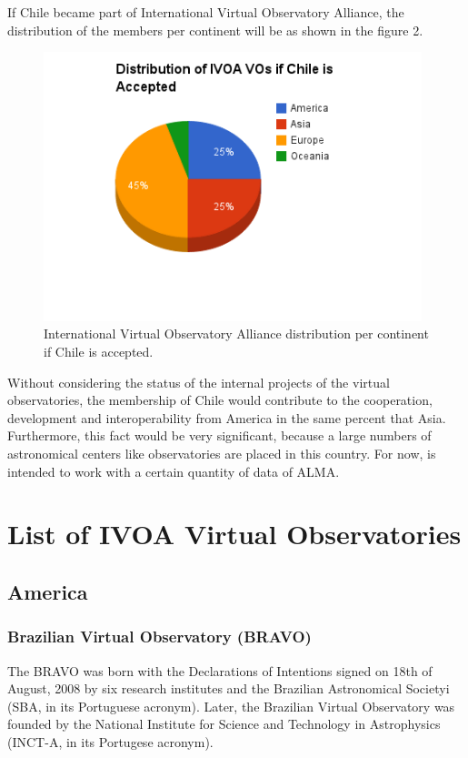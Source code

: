 \documentclass[11pt]{article}
\begin{document}
            If Chile became part of International Virtual Observatory Alliance,
the distribution of the members per continent will be as shown in the figure
2.\\

            \begin{figure}[h]
                \begin{center}
                    \includegraphics[width=110mm]
{if_Chile_is_Accepted_by_JDMT.png}
                    \caption{International Virtual Observatory Alliance
distribution per continent if Chile is accepted.}
                \end{center}
            \end{figure}

            Without considering the status of the internal projects of the
virtual observatories, the membership of Chile would contribute to the
cooperation, development and interoperability from America in the same percent
that Asia.  Furthermore, this fact would be very significant, because a large
numbers of astronomical centers like observatories are placed in this country.
For now, is intended to work with a certain quantity of data of ALMA.\\

    \section{List of IVOA Virtual Observatories}
        \subsection{America}
            \subsubsection{Brazilian Virtual Observatory (BRAVO)}
            The BRAVO was born with the Declarations of Intentions signed on
18th of August, 2008 by six research institutes and the Brazilian Astronomical
Societyi (SBA, in its Portuguese acronym). Later, the Brazilian Virtual
Observatory was founded by the National Institute for Science and Technology in
Astrophysics (INCT-A, in its Portugese acronym).
\end{document}
